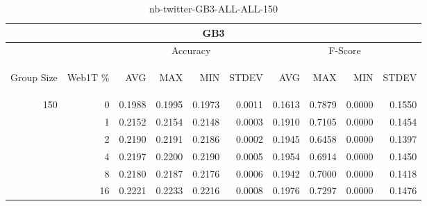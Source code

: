 \begin{center}
\begin{table}[htbp]
\begin{center}
\begin{tabular}{ | r | r | r | r | r | r | r | r | r | r |}
\hline
\multicolumn{10}{|c|}{GB3}\\
\hline
 & & \multicolumn{4}{|c|}{Accuracy} & \multicolumn{4}{|c|}{F-Score}\\ \cline{3-10}
\begin{sideways}Group Size\end{sideways} & \begin{sideways}Web1T \%\end{sideways} & \begin{sideways}AVG\end{sideways} & \begin{sideways}MAX\end{sideways} & \begin{sideways}MIN\end{sideways} & \begin{sideways}STDEV\end{sideways} & \begin{sideways}AVG\end{sideways} & \begin{sideways}MAX\end{sideways} & \begin{sideways}MIN\end{sideways} & \begin{sideways}STDEV\end{sideways}\\
\hline
\multirow{5}{*}{150}
 & 0 & 0.1988 & 0.1995 & 0.1973 & 0.0011 & 0.1613 & 0.7879 & 0.0000 & 0.1550\\ \cline{2-10}
 & 1 & 0.2152 & 0.2154 & 0.2148 & 0.0003 & 0.1910 & 0.7105 & 0.0000 & 0.1454\\ \cline{2-10}
 & 2 & 0.2190 & 0.2191 & 0.2186 & 0.0002 & 0.1945 & 0.6458 & 0.0000 & 0.1397\\ \cline{2-10}
 & 4 & 0.2197 & 0.2200 & 0.2190 & 0.0005 & 0.1954 & 0.6914 & 0.0000 & 0.1450\\ \cline{2-10}
 & 8 & 0.2180 & 0.2187 & 0.2176 & 0.0006 & 0.1942 & 0.7000 & 0.0000 & 0.1418\\ \cline{2-10}
 & 16 & 0.2221 & 0.2233 & 0.2216 & 0.0008 & 0.1976 & 0.7297 & 0.0000 & 0.1476\\ \cline{2-10}
\hline
\end{tabular}
\caption{nb-twitter-GB3-ALL-ALL-150}
\label{table:nb-twitter-GB3-ALL-ALL-150}
\end{center}
\end{table}
\end{center}

